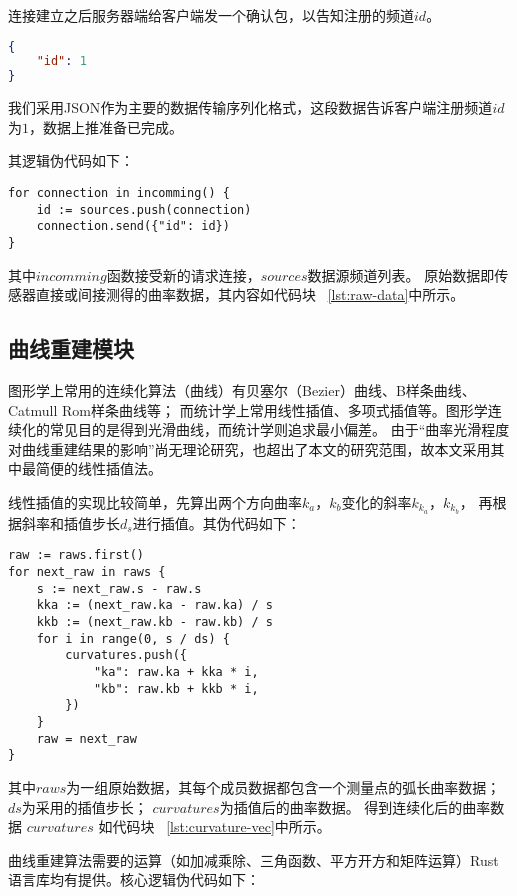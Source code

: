 连接建立之后服务器端给客户端发一个确认包，以告知注册的频道$id$。

\begin{lstlisting}[language=json,firstnumber=1,label={lst:register-resp},caption={数据源注册成功}]
{
    "id": 1
}
\end{lstlisting}

我们采用JSON\cite{rfc7159}作为主要的数据传输序列化格式，这段数据告诉客户端注册频道$id$为$1$，数据上推准备已完成。

其逻辑伪代码如下：

\begin{lstlisting}[caption={注册数据源}]
for connection in incomming() {
    id := sources.push(connection)
    connection.send({"id": id})
}
\end{lstlisting}

其中$incomming$函数接受新的请求连接，$sources$数据源频道列表。
原始数据即传感器直接或间接测得的曲率数据，其内容如代码块 ~\ref{lst:raw-data}中所示。

\subsection{曲线重建模块}
图形学上常用的连续化算法（曲线）有贝塞尔（Bezier）曲线、B样条曲线、Catmull Rom样条曲线等；
而统计学上常用线性插值、多项式插值等。图形学连续化的常见目的是得到光滑曲线，而统计学则追求最小偏差。
由于“曲率光滑程度对曲线重建结果的影响”尚无理论研究，也超出了本文的研究范围，故本文采用其中最简便的线性插值法。

线性插值的实现比较简单，先算出两个方向曲率$k_a$，$k_b$变化的斜率$k_{k_a}$，$k_{k_b}$，
再根据斜率和插值步长$d_s$进行插值。其伪代码如下：

\begin{lstlisting}[caption={线性插值法}]
raw := raws.first()
for next_raw in raws {
    s := next_raw.s - raw.s
    kka := (next_raw.ka - raw.ka) / s
    kkb := (next_raw.kb - raw.kb) / s
    for i in range(0, s / ds) {
        curvatures.push({
            "ka": raw.ka + kka * i, 
            "kb": raw.kb + kkb * i,
        })
    }
    raw = next_raw
}
\end{lstlisting}

其中$raws$为一组原始数据，其每个成员数据都包含一个测量点的弧长曲率数据；
$ds$为采用的插值步长；
$curvatures$为插值后的曲率数据。
得到连续化后的曲率数据 $curvatures$ 如代码块 ~\ref{lst:curvature-vec}中所示。

曲线重建算法需要的运算（如加减乘除、三角函数、平方开方和矩阵运算）Rust语言库均有提供。核心逻辑伪代码如下：

